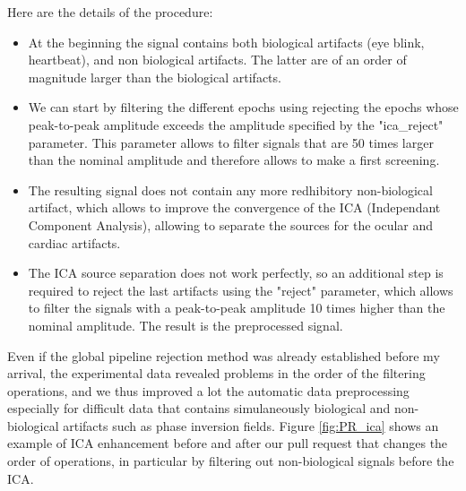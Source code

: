 Here are the details of the procedure:
\begin{itemize}
    \item At the beginning the signal contains both biological artifacts (eye blink, heartbeat), and non biological artifacts. The latter are of an order of magnitude larger than the biological artifacts.
    \item We can start by filtering the different epochs using rejecting the epochs whose peak-to-peak amplitude exceeds the amplitude specified by the "ica\_reject" parameter. This parameter allows to filter signals that are 50 times larger than the nominal amplitude and therefore allows to make a first screening.
    \item The resulting signal does not contain any more redhibitory non-biological artifact, which allows to improve the convergence of the ICA (Independant Component Analysis), allowing to separate the sources for the ocular and cardiac artifacts.
    \item The ICA source separation does not work perfectly, so an additional step is required to reject the last artifacts using the "reject" parameter, which allows to filter the signals with a peak-to-peak amplitude 10 times higher than the nominal amplitude. The result is the preprocessed signal.
\end{itemize}

Even if the global pipeline rejection method was already established before my arrival, the experimental data revealed problems in the order of the filtering operations, and we thus improved a lot the automatic data preprocessing especially for difficult data that contains simulaneously biological and non-biological artifacts such as phase inversion fields. Figure \ref{fig:PR_ica} shows an example of ICA enhancement before and after our pull request that changes the order of operations, in particular by filtering out non-biological signals before the ICA.


